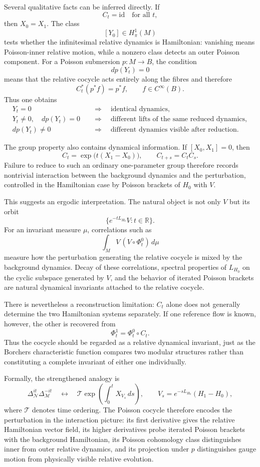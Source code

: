 \documentclass[11pt]{article}
\newcommand{\M}{\mathcal M}
\newcommand{\N}{\mathcal N}
\newcommand{\id}{\mathrm{id}}
\begin{document}
Several qualitative facts can be inferred directly.  If
\[
C_t=\id\quad\text{for all }t,
\]
then $X_0=X_1$.  The class
\[
[Y_0]\in H_\pi^1(M)
\]
tests whether the infinitesimal relative dynamics is Hamiltonian: vanishing
means Poisson-inner relative motion, while a nonzero class detects an outer
Poisson component.  For a Poisson submersion $p:M\to B$, the condition
\[
dp(Y_t)=0
\]
means that the relative cocycle acts entirely along the fibres and therefore
\[
C_t^*(p^*f)=p^*f,\qquad f\in C^\infty(B).
\]
Thus one obtains
\[
\begin{aligned}
Y_t=0
&\quad\Longrightarrow\quad \text{identical dynamics},\\
Y_t\neq0,\quad dp(Y_t)=0
&\quad\Longrightarrow\quad
\text{different lifts of the same reduced dynamics},\\
dp(Y_t)\neq0
&\quad\Longrightarrow\quad
\text{different dynamics visible after reduction}.
\end{aligned}
\]

The group property also contains dynamical information.  If
$[X_0,X_1]=0$, then
\[
C_t=\exp\bigl(t(X_1-X_0)\bigr),
\qquad C_{t+s}=C_tC_s.
\]
Failure to reduce to such an ordinary one-parameter group therefore records
nontrivial interaction between the background dynamics and the perturbation,
controlled in the Hamiltonian case by Poisson brackets of $H_0$ with $V$.

This suggests an ergodic interpretation.  The natural object is not only $V$
but its orbit
\[
\{e^{-tL_{H_0}}V:t\in\mathbb R\}.
\]
For an invariant measure $\mu$, correlations such as
\[
\int_M V\,(V\circ\Phi_t^0)\,d\mu
\]
measure how the perturbation generating the relative cocycle is mixed by the
background dynamics.  Decay of these correlations, spectral properties of
$L_{H_0}$ on the cyclic subspace generated by $V$, and the behavior of iterated
Poisson brackets are natural dynamical invariants attached to the relative
cocycle.

There is nevertheless a reconstruction limitation: $C_t$ alone does not
generally determine the two Hamiltonian systems separately.  If one reference
flow is known, however, the other is recovered from
\[
\Phi_t^1=\Phi_t^0\circ C_t.
\]
Thus the cocycle should be regarded as a relative dynamical invariant, just as
the Borchers characteristic function compares two modular structures rather
than constituting a complete invariant of either one individually.

Formally, the strengthened analogy is
\[
\boxed{
\Delta_\N^{it}\Delta_\M^{-it}
\quad\longleftrightarrow\quad
\mathcal T\exp\left(\int_0^t X_{V_s}\,ds\right),
\qquad
V_s=e^{-sL_{H_0}}(H_1-H_0),
}
\]
where $\mathcal T$ denotes time ordering.  The Poisson cocycle therefore
encodes the perturbation in the interaction picture: its first derivative gives
the relative Hamiltonian vector field, its higher derivatives probe iterated
Poisson brackets with the background Hamiltonian, its Poisson cohomology class
distinguishes inner from outer relative dynamics, and its projection under $p$
distinguishes gauge motion from physically visible relative evolution.
\end{document}
